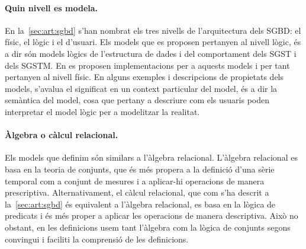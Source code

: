 



\paragraph{Quin nivell es modela.}
En la~\autoref{sec:art:sgbd} s'han nombrat els tres nivells de
l'arquitectura dels \gls {SGBD}: el físic, el lògic i el d'usuari.
Els models que es proposen pertanyen al nivell lògic, és a dir són
models lògics de l'estructura de dades i del comportament dels
\gls{SGST} i dels \gls{SGSTM}.  En  es
proposen implementacions per a aquests models i per tant pertanyen al
nivell físic.  En alguns exemples i descripcions de propietats dels
models, s'avalua el significat en un context particular del model, és
a dir la semàntica del model, cosa que pertany a descriure com els
usuaris poden interpretar el model lògic per a modelitzar la realitat.





\paragraph{Àlgebra o càlcul relacional.} Els models que definim són
similars a l'àlgebra relacional. L'àlgebra relacional es basa en la
teoria de conjunts, que és més propera a la definició d'una sèrie
temporal com a conjunt de mesures i a aplicar-hi operacions de manera
prescriptiva. Alternativament, el càlcul relacional, que com s'ha
descrit a la~\autoref{sec:art:sgbd} és equivalent a
l'àlgebra relacional, es basa en la lògica de predicats i és més
proper a aplicar les operacions de manera descriptiva. Això no
obstant, en les definicions usem tant l'àlgebra com la lògica de
conjunts segons convingui i faciliti la comprensió de les definicions.




